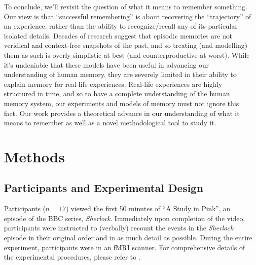 \documentclass{article}
\begin{document}
To conclude, we'll revisit the question of what it means to remember something. Our view is that ``successful remembering'' is about recovering the ``trajectory'' of an experience, rather than the ability to recognize/recall any of its particular isolated details. Decades of research suggest that episodic memories are not veridical and context-free snapshots of the past, and so treating (and modelling) them as such is overly simplistic at best (and counterproductive at worst). While it's undeniable that these models have been useful in advancing our understanding of human memory, they are severely limited in their ability to explain memory for real-life experiences. Real-life experiences are highly structured in time, and so to have a complete understanding of the human memory system, our experiments and models of memory must not ignore this fact. Our work provides a theoretical advance in our understanding of what it means to remember as well as a novel methodological tool to study it.

\pagebreak


\pagebreak
\section*{Methods}
\label{sec:methods}

\subsection*{Participants and Experimental Design}
Participants ($n=17$) viewed the first 50 minutes of ``A Study in Pink'', an episode of the BBC series, \textit{Sherlock}. Immediately upon completion of the video, participants were instructed to (verbally) recount the events in the \textit{Sherlock} episode in their original order and in as much detail as possible. During the entire experiment, participants were in an fMRI scanner. For comprehensive details of the experimental procedures, please refer to \cite{ChenEtal17}.
\end{document}
